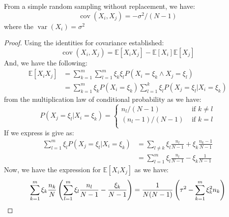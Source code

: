 \begin{lemma}
    From a simple random sampling without replacement, we have:
    \begin{equation*}
        \operatorname{cov}(X_i, X_j) = -\sigma^2/(N-1)
    \end{equation*}
    where the $\operatorname{var}(X_i) = \sigma^2$
\end{lemma}
\begin{proof}
    Using the identities for covariance established:
    \begin{equation*}
        \operatorname{cov}(X_i, X_j) = \mathbb{E}[X_iX_j] - \mathbb{E}[X_i]\mathbb{E}[X_j]
    \end{equation*}
    And, we have the following:
    \begin{equation*}
    \begin{aligned}
        \mathbb{E}[X_iX_j] &= \sum^m_{k=1}\sum^m_{l=1}\xi_k\xi_lP(X_i = \xi_k \wedge X_j = \xi_l) \\
        &= \sum^m_{k=1}\xi_kP(X_i = \xi_k)\sum^k_{l=1}\xi_lP(X_j = \xi_l | X_i = \xi_k)
    \end{aligned}
    \end{equation*}
    from the multiplication law of conditional probability as we have:
    \begin{equation*}
        P(X_j = \xi_l | X_i = \xi_k) = \begin{cases}
            n_l/(N-1) & \text{ if } k \ne l \\
            (n_l - 1)/(N-1) & \text{ if } k = l \\
        \end{cases}
    \end{equation*}
    If we express is give as:
    \begin{equation*}
    \begin{aligned}
        \sum^m_{l=1}\xi_lP(X_j = \xi_l | X_i = \xi_k) &= \sum_{l\ne k}\xi_l\frac{n_l}{N-1} + \xi_k \frac{n_k-1}{N-1} \\
        &= \sum^m_{l=1}\xi_l\frac{n_l}{N-1} - \xi_k\frac{1}{N-1}
    \end{aligned}
    \end{equation*}
    Now, we have the expression for $\mathbb{E}[X_iX_j]$ as we have:
    \begin{equation*}
    \begin{aligned}
        \sum^m_{k=1}\xi_k\frac{n_k}{N}\bracka{\sum^m_{l=1}\xi_l\frac{n_l}{N-1} - \frac{\xi_k}{N-1}} &= \frac{1}{N(N-1)}\bracka{\tau^2 - \sum^m_{k=1}\xi_k^2n_k} \\

\end{aligned}
\end{equation*}
\end{proof}
